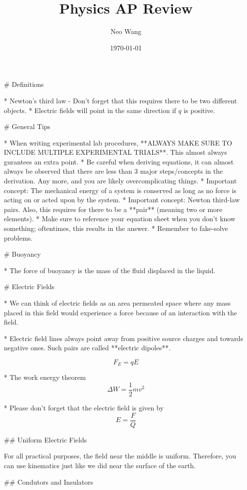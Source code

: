 \documentclass{article}
\title{Physics AP Review}
\author{Neo Wang}
\date{\today}
\begin{document}
\maketitle
\tableofcontents

\begin{markdown}

# Definitions

* Newton's third law - Don't forget that this requires there to be two different objects.
* Electric fields will point in the same direction if $q$ is positive.

# General Tips

* When writing experimental lab procedures, **ALWAYS MAKE SURE TO INCLUDE MULTIPLE EXPERIMENTAL TRIALS**. This almost always gurantees an extra point.
* Be careful when deriving equations, it can almost always be observed that there are less than 3 major steps/concepts in the derivation. Any more, and you are likely overcomplicating things.
* Important concept: The mechanical energy of a system is conserved as long as no force is acting on or acted upon by the system.
* Important concept: Newton third-law pairs. Also, this requires for there to be a **pair** (meaning two or more elements).
* Make sure to reference your equation sheet when you don't know something; oftentimes, this results in the answer.
* Remember to fake-solve problems.

# Buoyancy

* The force of buoyancy is the mass of the fluid displaced in the liquid.

# Electric Fields

* We can think of electric fields as an area permeated space where any mass placed in this field would experience a force because of an interaction with the field.

* Electric field lines always point away from positive source charges and towards negative ones. Such pairs are called **electric dipoles**.

$$
F_E = qE
$$

* The work energy theorem $$\Delta W = \frac{1}{2}mv^2$$

* Please don't forget that the electric field is given by $$E = \frac{F}{Q}$$

## Uniform Electric Fields

For all practical purposes, the field near the middle is uniform. Therefore, you can use kinematics just like we did near the surface of the earth.

## Condutors and Insulators


\end{markdown}
\end{document}
